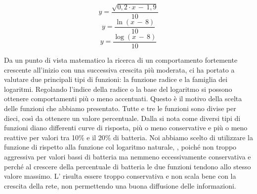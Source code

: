 \begin{equation}
	\label{eq:df_bat_radq}
	y=\dfrac{\sqrt{0,2\cdot x\,-\,1,9}}{10}
\end{equation}
\begin{equation}
	\label{eq:df_bat_ln}
	y=\dfrac{\ln\left(x\,-\,8\right) }{10}
\end{equation}
\begin{equation}
	\label{eq:df_bat_log}
	y=\dfrac{\log\left(x\,-\,8\right) }{10}
\end{equation}

Da un punto di vista matematico la ricerca di un comportamento fortemente crescente all'inizio con una successiva crescita più moderata, ci ha portato a valutare due principali tipi di funzioni: la funzione radice e la famiglia dei logaritmi. Regolando l'indice della radice o la base del logaritmo si possono ottenere comportamenti più o meno accentuati. Questo è il motivo della scelta delle funzioni che abbiamo presentato.
Tutte e tre le funzioni sono divise per dieci, così da ottenere un valore percentuale. Dalla  si nota come diversi tipi di funzioni diano differenti curve di risposta, più o meno conservative e più o meno reattive per valori tra 10\% e il 20\% di batteria. Noi abbiamo scelto di utilizzare la funzione di  rispetto alla funzione col logaritmo naturale, , poiché non troppo aggressiva per valori bassi di batteria ma nemmeno eccessivamente conservativa e perché al crescere della percentuale di batteria le due funzioni tendono allo stesso valore massimo. L' risulta essere troppo conservativa e non scala bene con la crescita della rete, non permettendo una buona diffusione delle informazioni.
\medskip


